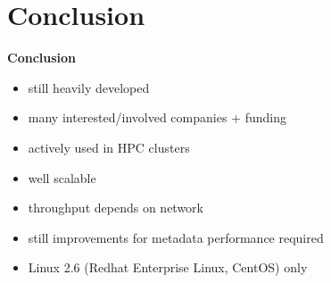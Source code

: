 \section{Conclusion}
\begin{frame}{\textbf{Conclusion}}
    \begin{itemize}
        \item still heavily developed
        \item many interested/involved companies + funding
        \item actively used in HPC clusters
        \item well scalable
        \item throughput depends on network
        \item still improvements for metadata performance required
        \item Linux 2.6 (Redhat Enterprise Linux, CentOS) only
    \end{itemize}
\end{frame}
